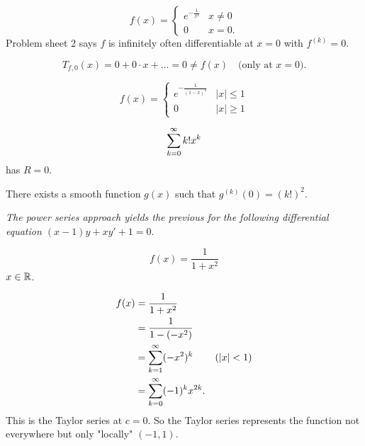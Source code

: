 \documentclass[10pt, a4paper]{article}
\begin{document}
\begin{example}
    \[
    f(x) = \begin{cases}
        e ^ {-\frac{1}{x ^ 2}} & x \neq 0 \\
        0 & x = 0.
    \end{cases}
    \]
    Problem sheet $2$ says $f$ is infinitely often differentiable at $x = 0$ with $f ^ {(k)} = 0$.

    \begin{solution}
        \[
        T_{f, 0}(x) = 0 + 0 \cdot x + \dotsc = 0 \neq f(x)\quad\text{(only at $x = 0$)}.
        \]
    \end{solution}
\end{example}

\begin{example}
    \[
    f(x) = \begin{cases}
        e ^ {-\frac{1}{(1 - x) ^ 2}} & |x| \leq 1 \\
        0 & |x| \geq 1
    \end{cases}
    \]
\end{example}

\begin{example}
    \[
    \sum_{k = 0}^{\infty} k!x ^ k
    \]
    has $R = 0$.

    \begin{solution}
        There exists a smooth function $g(x)$ such that $g ^ {(k)}(0) = (k!) ^ 2$.
    \end{solution}
\end{example}
\textit{The power series approach yields the previous for the following differential equation $(x - 1)y + xy' + 1 = 0$}.

\begin{example}
    \[
    f(x) = \frac{1}{1 + x ^ 2}
    \]
    $x \in \mathbb{R}$.
    \begin{solution}
        \begin{align*}
            f(x) &= \frac{1}{1 + x ^ 2} \\
            &= \frac{1}{1 - (-x ^ 2)} \\
            &= \sum_{k = 1}^{\infty}(-x ^ 2) ^ k & (|x| < 1) \\
            &= \sum_{k = 0}^{\infty}(-1) ^ kx ^ {2k}.
        \end{align*}
        This is the Taylor series at $c = 0$.
        So the Taylor series represents the function not everywhere but only "locally" $(-1, 1)$.
    \end{solution}
\end{example}
\end{document}
